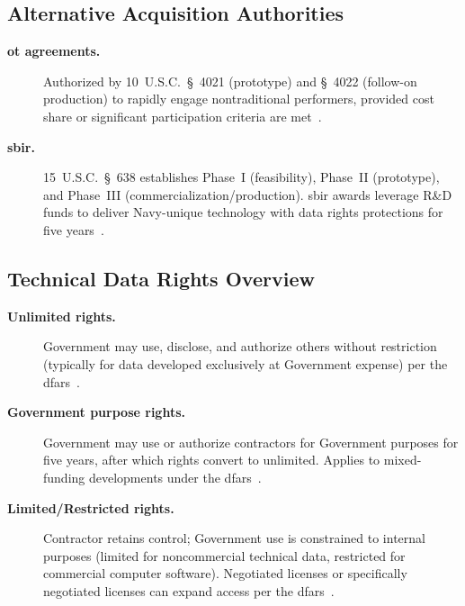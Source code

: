 \documentclass[../main.tex]{subfiles}
\begin{document}
\subsection{Alternative Acquisition Authorities}
\begin{description}
  \item[\textbf{\ac{ot} agreements.}] Authorized by 10~U.S.C.~\S~4021 (prototype) and \S~4022 (follow-on production) to rapidly engage nontraditional performers, provided cost share or significant participation criteria are met~\autocite{USC-4021-OTA,USC-4022-OTF}.
  \item[\textbf{\ac{sbir}.}]15~U.S.C.~\S~638 establishes Phase~I (feasibility), Phase~II (prototype), and Phase~III (commercialization/production). \ac{sbir} awards leverage R\&D funds to deliver Navy-unique technology with data rights protections for five years~\autocite{USC-638-SBIR}.
\end{description}

\subsection{Technical Data Rights Overview}
\begin{description}
  \item[\textbf{Unlimited rights.}] Government may use, disclose, and authorize others without restriction (typically for data developed exclusively at Government expense) per the \ac{dfars}~\autocite{DFARS}.
  \item[\textbf{Government purpose rights.}] Government may use or authorize contractors for Government purposes for five years, after which rights convert to unlimited. Applies to mixed-funding developments under the \ac{dfars}~\autocite{DFARS}.
  \item[\textbf{Limited/Restricted rights.}] Contractor retains control; Government use is constrained to internal purposes (limited for noncommercial technical data, restricted for commercial computer software). Negotiated licenses or specifically negotiated licenses can expand access per the \ac{dfars}~\autocite{DFARS}.
\end{description}
\end{document}
